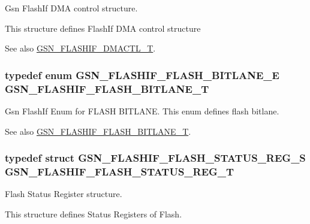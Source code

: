 Gsn FlashIf DMA control structure. 

This structure defines FlashIf DMA control structure

\begin{DoxySeeAlso}{See also}
\hyperlink{a00647_ga3191e2eabef0c8e1b95922431d75565f}{GSN\_\-FLASHIF\_\-DMACTL\_\-T}. 
\end{DoxySeeAlso}
\hypertarget{a00647_gaf1a2041a13f5df83afd39cc00dd1f5c0}{
\subsubsection[{GSN\_\-FLASHIF\_\-FLASH\_\-BITLANE\_\-T}]{\setlength{\rightskip}{0pt plus 5cm}typedef enum {\bf GSN\_\-FLASHIF\_\-FLASH\_\-BITLANE\_\-E}  {\bf GSN\_\-FLASHIF\_\-FLASH\_\-BITLANE\_\-T}}}
\label{a00647_gaf1a2041a13f5df83afd39cc00dd1f5c0}


Gsn FlashIf Enum for FLASH BITLANE. This enum defines flash bitlane. 

\begin{DoxySeeAlso}{See also}
\hyperlink{a00647_gaf1a2041a13f5df83afd39cc00dd1f5c0}{GSN\_\-FLASHIF\_\-FLASH\_\-BITLANE\_\-T}. 
\end{DoxySeeAlso}
\hypertarget{a00647_ga817ad96ff2f6956f431999227f67c3ca}{
\subsubsection[{GSN\_\-FLASHIF\_\-FLASH\_\-STATUS\_\-REG\_\-T}]{\setlength{\rightskip}{0pt plus 5cm}typedef struct {\bf GSN\_\-FLASHIF\_\-FLASH\_\-STATUS\_\-REG\_\-S}  {\bf GSN\_\-FLASHIF\_\-FLASH\_\-STATUS\_\-REG\_\-T}}}
\label{a00647_ga817ad96ff2f6956f431999227f67c3ca}


Flash Status Register structure. 

This structure defines Status Registers of Flash.

